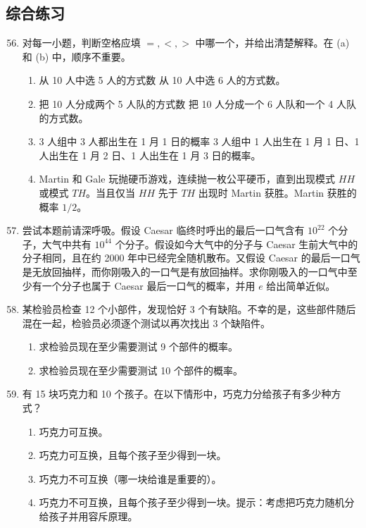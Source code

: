 \documentclass[UTF8, 12pt, fontset=fandol, oneside]{ctexart}
\begin{document}
\subsection*{综合练习}

\begin{enumerate}
  \setcounter{enumi}{55}
  \item 对每一小题，判断空格应填 $=,<,>$ 中哪一个，并给出清楚解释。在 (a) 和 (b) 中，顺序不重要。
  \begin{enumerate}
    \item 从 10 人中选 5 人的方式数 \underline{\hspace{1cm}} 从 10 人中选 6 人的方式数。
    \item 把 10 人分成两个 5 人队的方式数 \underline{\hspace{1cm}} 把 10 人分成一个 6 人队和一个 4 人队的方式数。
    \item 3 人组中 3 人都出生在 1 月 1 日的概率 \underline{\hspace{1cm}} 3 人组中 1 人出生在 1 月 1 日、1 人出生在 1 月 2 日、1 人出生在 1 月 3 日的概率。
    \item Martin 和 Gale 玩抛硬币游戏，连续抛一枚公平硬币，直到出现模式 $HH$ 或模式 $TH$。当且仅当 $HH$ 先于 $TH$ 出现时 Martin 获胜。Martin 获胜的概率 \underline{\hspace{1cm}} $1/2$。
  \end{enumerate}

  \item 尝试本题前请深呼吸。假设 Caesar 临终时呼出的最后一口气含有 $10^{22}$ 个分子，大气中共有 $10^{44}$ 个分子。假设如今大气中的分子与 Caesar 生前大气中的分子相同，且在约 2000 年中已经完全随机散布。又假设 Caesar 的最后一口气是无放回抽样，而你刚吸入的一口气是有放回抽样。求你刚吸入的一口气中至少有一个分子也属于 Caesar 最后一口气的概率，并用 $e$ 给出简单近似。

  \item 某检验员检查 12 个小部件，发现恰好 3 个有缺陷。不幸的是，这些部件随后混在一起，检验员必须逐个测试以再次找出 3 个缺陷件。
  \begin{enumerate}
    \item 求检验员现在至少需要测试 9 个部件的概率。
    \item 求检验员现在至少需要测试 10 个部件的概率。
  \end{enumerate}

  \item 有 15 块巧克力和 10 个孩子。在以下情形中，巧克力分给孩子有多少种方式？
  \begin{enumerate}
    \item 巧克力可互换。
    \item 巧克力可互换，且每个孩子至少得到一块。
    \item 巧克力不可互换（哪一块给谁是重要的）。
    \item 巧克力不可互换，且每个孩子至少得到一块。提示：考虑把巧克力随机分给孩子并用容斥原理。
  \end{enumerate}


\end{enumerate}
\end{document}
